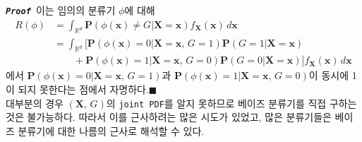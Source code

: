 \documentclass[11pt,onecolumn,twoside,a4size]{gsag3jnl}
\newcommand{\proof}{\texttt{\textit{\textbf{Proof }}}}
\begin{document}
\proof 이는 임의의 분류기 $\phi$에 대해
\begin{align}
  R(\phi)&=\int_{\mathbb{R}^d}\mathbf{P}(\phi(\mathbf{x})\ne G\vert\mathbf{X}=\mathbf{x})f_\mathbf{X}(\mathbf{x})\,d\mathbf{x}\\
  &=\int_{\mathbb{R}^d}[\mathbf{P}(\phi(\mathbf{x})=0\vert\mathbf{X}=\mathbf{x},\,G=1)\mathbf{P}(G=1\vert\mathbf{X}=\mathbf{x})\nonumber\\
  &\qquad+\mathbf{P}(\phi(\mathbf{x})=1\vert\mathbf{X}=\mathbf{x},\,G=0)\mathbf{P}(G=0\vert\mathbf{X}=\mathbf{x})]f_\mathbf{X}(\mathbf{x})\,d\mathbf{x}\nonumber
\end{align}
에서 $\mathbf{P}(\phi(\mathbf{x})=0\vert\mathbf{X}=\mathbf{x},\,G=1)$과 $\mathbf{P}(\phi(\mathbf{x})=1\vert\mathbf{X}=\mathbf{x},\,G=0)$이 동시에 1이 되지 못한다는 점에서 자명하다.\hfill$\blacksquare$\\

대부분의 경우 $(\mathbf{X},\,G)$의 \texttt{joint PDF}를 알지 못하므로 베이즈 분류기를 직접 구하는 것은 불가능하다. 따라서 이를 근사하려는 많은 시도가 있었고, 많은 분류기들은 베이즈 분류기에 대한 나름의 근사로 해석할 수 있다.
\end{document}
